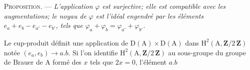 \textsc{Proposition}. --- \emph{L'application $\varphi$ est surjective; elle est compatible avec les augmentations; le noyau de $\varphi$ est l'idéal engendré par les éléments $e_{a}+e_{b}-e_{a'}-e_{b'}$, tels que $\varphi_{a}+\varphi_{b}=\varphi_{a'}+\varphi_{b'}$.}

Le cup-produit définit une application de $\mathrm D(\mathrm A)\times\mathrm D(\mathrm A)$ dans $\mathrm H^{2}(\mathrm A,\mathbf Z/2\,\mathbf Z)$ notée $(e_{a},e_{b})\to a.b$. Si l'on identifie $\mathrm H^{2}(\mathrm A,\mathbf Z/2\,\mathbf Z)$ au sous-groupe du groupe de Brauer de $\mathrm A$ formé des $x$ tels que $2x=0$, l'élément $a.b$
